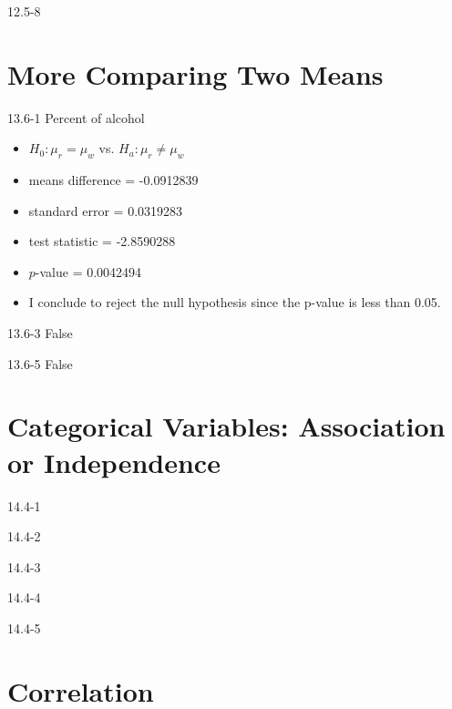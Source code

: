 \begin{exsol@solution}{12.5-8}

\end{exsol@solution}
\setcounter{chapter}{12}\chapter{More Comparing Two Means}
\begin{exsol@solution}{13.6-1}
Percent of alcohol

\begin{itemize}
  \item $H_0: \mu_r = \mu_w$ vs. $H_a: \mu_r \ne \mu_w$
  \item  means difference = -0.0912839
  \item  standard error  = 0.0319283
  \item  test statistic = -2.8590288
  \item  $p$-value = 0.0042494
  \item  I conclude to reject the null hypothesis since the p-value is less than 0.05.
\end{itemize}

\end{exsol@solution}
\begin{exsol@solution}{13.6-3}
False

\end{exsol@solution}
\begin{exsol@solution}{13.6-5}
False

\end{exsol@solution}
\setcounter{chapter}{13}\chapter{Categorical Variables: Association or Independence}
\begin{exsol@solution}{14.4-1}
\end{exsol@solution}
\begin{exsol@solution}{14.4-2}
\end{exsol@solution}
\begin{exsol@solution}{14.4-3}
\end{exsol@solution}
\begin{exsol@solution}{14.4-4}
\end{exsol@solution}
\begin{exsol@solution}{14.4-5}
\end{exsol@solution}
\setcounter{chapter}{14}\chapter{Correlation}
